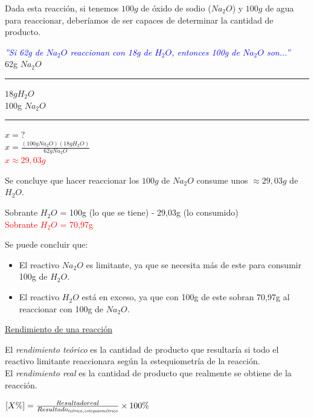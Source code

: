                 \indent Dada esta reacción, si tenemos $100g$ de óxido de sodio ($Na_2O$) y $100g$ de agua para reaccionar, deberíamos de ser capaces de determinar la cantidad de producto.
                \begin{center}
                    \textcolor{blue}{\textit{''Si 62g de $Na_2O$ reaccionan con 18g de $H_2O$, entonces 100g de $Na_2O$ son...''}} \\[5pt]
                    62g $Na_2O$ \rule{2cm}{0.4pt} $18g H_2O$ \\
                    100g $Na_2O$ \rule{2cm}{0.4pt}   $x = ?$ \\[5pt]
                    $x = \frac{(100g Na_2O)(18g H_2O)}{62g Na_2O}$ \\[5pt]
                    \textcolor{red}{$x \approx 29,03g$}
                \end{center}

                \indent Se concluye que hacer reaccionar los $100g$ de $Na_2O$ consume unos $\approx 29,03g$ de $H_2O$.

                \begin{center}
                    Sobrante $H_2O$ = 100g (lo que se tiene) - 29,03g (lo consumido) \\
                    \textcolor{red}{Sobrante $H_2O$ = 70,97g}
                \end{center}

                \indent Se puede concluir que:
                \begin{itemize} 
                    \item El reactivo $Na_2O$ es limitante, ya que se necesita más de este para consumir 100g de $H_2O$.
                    \item El reactivo $H_2O$ está en exceso, ya que con 100g de este sobran 70,97g al reaccionar con 100g de $Na_2O$.
                \end{itemize}

            \begin{center} \underline{Rendimiento de una reacción} \end{center}
                \indent El \textit{rendimiento teórico} es la cantidad de producto que resultaría si todo el reactivo limitante reaccionara según la estequiometría de la reacción. \\
                \indent El \textit{rendimiento real} es la cantidad de producto que realmente se obtiene de la reacción.

                \begin{center} 
                    $[X \%] = \frac{Resultado real}{Resultado_{ \text{\textit{teórico}}, \text{\textit{estequiométrico}}}} \times 100\%$ 
                \end{center}


